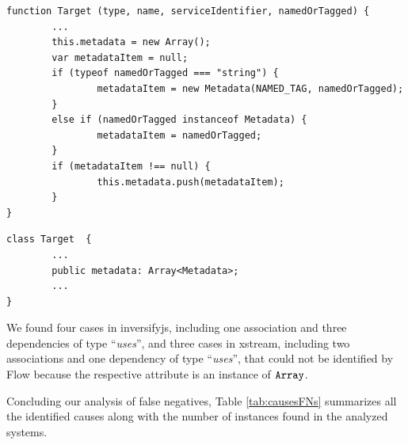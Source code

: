\documentclass[review]{elsarticle}
\newcommand{\aspas}[1]{{``#1''}}
\newcommand{\mcode}[1]{$\tt #1$}
\begin{document}
\vspace{0.2cm}

\begin{lstlisting}[caption=Example of class constructor that has an attribute of type \mcode{Array},  label=lst_array_inversifyjs, emph={[2]module},emphstyle={[2]\ttfamily\bfseries\color{darkgreen}}]
function Target (type, name, serviceIdentifier, namedOrTagged) {
		...
		this.metadata = new Array();
		var metadataItem = null;
		if (typeof namedOrTagged === "string") {
				metadataItem = new Metadata(NAMED_TAG, namedOrTagged);
		}
		else if (namedOrTagged instanceof Metadata) {
				metadataItem = namedOrTagged;
		}
		if (metadataItem !== null) {
				this.metadata.push(metadataItem);
		}
}
\end{lstlisting} 

\begin{lstlisting}[caption=TypeScript implementation of a class that has an attribute of type \mcode{Array<Metadata>},  label=lst_ts_array_inversifyjs, emph={[2]Metadata},emphstyle={[2]\ttfamily\bfseries\color{darkgreen}}]
class Target  {
		...
		public metadata: Array<Metadata>;
		...
}
\end{lstlisting} 

We found four cases in {\sc inversifyjs}, including one association and three dependencies of type \aspas{\textit{uses}}, and three cases in {\sc xstream}, including two associations and one dependency of type \aspas{\textit{uses}}, that could not be identified by Flow because the respective attribute is an instance of \mcode{Array}. 

Concluding our analysis of false negatives, Table \ref{tab:causesFNs} summarizes all the identified causes along with the number of instances found in the analyzed systems. 
\end{document}
